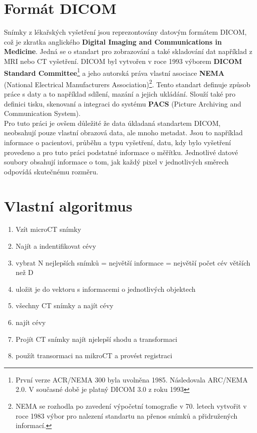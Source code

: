 \documentclass{thesis}%
\begin{document}
\chapter{Formát DICOM}
Snímky z lékařských vyšetření jsou reprezontovány datovým formátem DICOM, což je zkratka anglického \textbf{Digital Imaging and Communications in Medicine}. Jedná se o standart pro zobrazování a také skladování dat například z MRI nebo CT vyšetření. DICOM byl vytvořen v roce 1993 výborem \textbf{DICOM Standard Committee}\footnote[7]{První verze ACR/NEMA 300 byla uvolněna 1985. Následovala ARC/NEMA 2.0. V současné době je platný DICOM 3.0 z roku 1993} a jeho autorská práva vlastní asociace  \textbf{NEMA} (National Electrical Manufacturers Association)\footnote[8]{NEMA se rozhodla po zavedení výpočetní tomografie v 70. letech vytvořit v roce 1983 výbor pro nalezení standartu na přenos snímků a přidružených informací.}. Tento standart definuje způsob práce s daty a to například sdílení, mazání a jejich ukládání. Slouží také pro definici tisku, skenovaní a integraci do systému \textbf{PACS} (Picture Archiving and Communication System).\\
Pro tuto práci je ovšem důležité že data úkladaná standartem DICOM, neobsahují pouze vlastní obrazová data, ale mnoho metadat. Jsou to například informace o pacientovi, průběhu a typu vyšetření, datu, kdy bylo vyšetření provedeno a pro tuto práci podstatné informace o měřítku. Jednotlivé datové soubory obsahují informace o tom, jak každý pixel v jednotlivých směrech odpovídá skutečnému rozměru.
 

\chapter{Vlastní algoritmus}
\begin{enumerate}
\item Vzít microCT snímky
\item Najít a indentifikovat cévy 
\item vybrat N nejlepších snímků = největší informace = největší počet cév větších než D
\item uložit je do vektoru s informacemi o jednotlivých objektech
\item všechny CT snímky a najít cévy
\item najít cévy
\item Projít CT snímky najít njelepší shodu a transformaci
\item použít transormaci na mikroCT a provést registraci
\end{enumerate}
\end{document}
